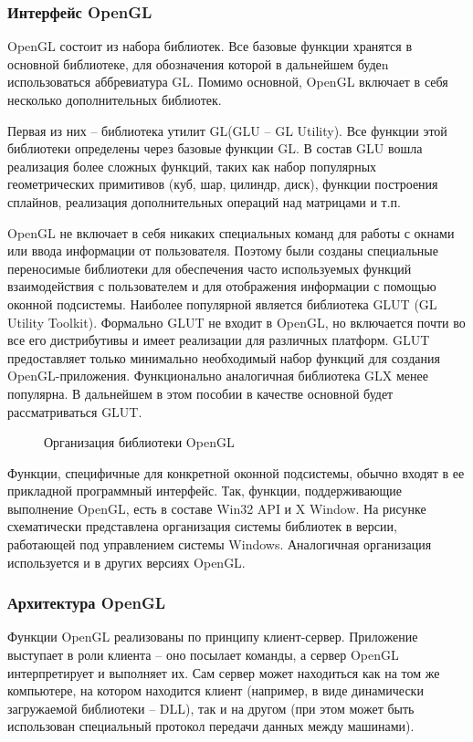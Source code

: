 \subsubsection{Интерфейс OpenGL}
OpenGL состоит из набора библиотек. Все базовые функции хранятся в основной библиотеке, для обозначения которой в дальнейшем будеn использоваться аббревиатура GL. Помимо основной, OpenGL включает в себя несколько дополнительных библиотек.

Первая из них – библиотека утилит GL(GLU – GL Utility). Все функции этой библиотеки определены через базовые функции GL. В состав GLU вошла реализация более сложных функций, таких как набор популярных геометрических примитивов (куб, шар, цилиндр, диск), функции построения сплайнов, реализация дополнительных операций над матрицами и т.п.

OpenGL не включает в себя никаких специальных команд для работы с окнами или ввода информации от пользователя. Поэтому были созданы специальные переносимые библиотеки для обеспечения часто используемых функций взаимодействия с пользователем и для отображения информации с помощью оконной подсистемы. Наиболее популярной является библиотека GLUT (GL Utility Toolkit). Формально GLUT не входит в OpenGL, но включается почти во все его дистрибутивы и имеет реализации для различных платформ. GLUT предоставляет только минимально необходимый набор функций для создания OpenGL-приложения. Функционально аналогичная библиотека GLX менее популярна. В дальнейшем в этом пособии в качестве основной будет рассматриваться GLUT.

\begin{figure}[H]
	\caption{Организация библиотеки OpenGL}
	\label{diagram6:image}
\end{figure}

Функции, специфичные для конкретной оконной подсистемы, обычно входят в ее прикладной программный интерфейс. Так, функции, поддерживающие выполнение OpenGL, есть в составе Win32 API и X Window. На рисунке схематически представлена организация системы библиотек в версии, работающей под управлением системы Windows. Аналогичная организация используется и в других версиях OpenGL.

\subsubsection{Архитектура OpenGL}

Функции OpenGL реализованы по принципу клиент-сервер. Приложение выступает в роли клиента – оно посылает команды, а сервер OpenGL интерпретирует и выполняет их. Сам сервер может находиться как на том же компьютере, на котором находится клиент (например, в виде динамически загружаемой библиотеки – DLL), так и на другом (при этом может быть использован специальный протокол передачи данных между машинами).

